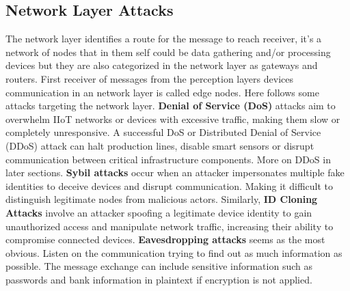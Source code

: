 \documentclass[article,a4paper]{IEEEtran}
\begin{document}
\subsection{Network Layer Attacks}
The network layer identifies a route for the message to reach receiver, it's a network of nodes that in them self could be data gathering and/or processing devices but they are also categorized in the network layer as gateways and routers. First receiver of messages from the perception layers devices communication in an network layer is called edge nodes. Here follows some attacks targeting the network layer.   
\newline\newline
\textbf{Denial of Service (DoS)} attacks aim to overwhelm IIoT networks or devices with excessive traffic, making them slow or completely unresponsive. A successful DoS or Distributed Denial of Service (DDoS) attack can halt production lines, disable smart sensors or disrupt communication between critical infrastructure components. More on DDoS in later sections. 
\newline
\textbf{Sybil attacks} occur when an attacker impersonates multiple fake identities to deceive devices and disrupt communication. Making it difficult to distinguish legitimate nodes from malicious actors. Similarly, \textbf{ID Cloning Attacks} involve an attacker spoofing a legitimate device identity to gain unauthorized access and manipulate network traffic, increasing their ability to compromise connected devices. 
\newline
\textbf{Eavesdropping attacks} seems as the most obvious. Listen on the communication trying to find out as much information as possible. The message exchange can include sensitive information such as passwords and bank information in plaintext if encryption is not applied. 
\end{document}
